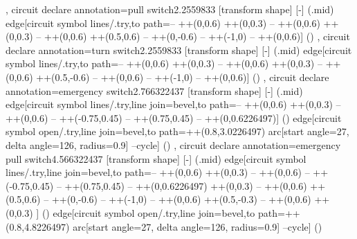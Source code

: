 {{  },
  circuit declare annotation={pull switch}{2.2559833\tikzcircuitssizeunit}
  {
    [transform shape]
    [-]
    (\tikzlastnode.mid) edge[circuit symbol lines/.try,to path={-- ++(0,0.6\tikzcircuitssizeunit) ++(0,0.3\tikzcircuitssizeunit) -- ++(0,0.6\tikzcircuitssizeunit)  ++(0,0.3\tikzcircuitssizeunit) -- ++(0,0.6\tikzcircuitssizeunit) ++(0.5\tikzcircuitssizeunit,0.6\tikzcircuitssizeunit) -- ++(0,-0.6\tikzcircuitssizeunit) -- ++(-1\tikzcircuitssizeunit,0) -- ++(0,0.6\tikzcircuitssizeunit)}] ()
  },
  circuit declare annotation={turn switch}{2.2559833\tikzcircuitssizeunit}
  {
    [transform shape]
    [-]
    (\tikzlastnode.mid) edge[circuit symbol lines/.try,to path={-- ++(0,0.6\tikzcircuitssizeunit) ++(0,0.3\tikzcircuitssizeunit) -- ++(0,0.6\tikzcircuitssizeunit)  ++(0,0.3\tikzcircuitssizeunit) -- ++(0,0.6\tikzcircuitssizeunit) ++(0.5\tikzcircuitssizeunit,-0.6\tikzcircuitssizeunit) -- ++(0,0.6\tikzcircuitssizeunit) -- ++(-1\tikzcircuitssizeunit,0) -- ++(0,0.6\tikzcircuitssizeunit)}] ()
  },
  circuit declare annotation={emergency switch}{2.766322437\tikzcircuitssizeunit}
  {
    [transform shape]
    [-]
    (\tikzlastnode.mid) edge[circuit symbol lines/.try,line join=bevel,to path={-- ++(0,0.6\tikzcircuitssizeunit) ++(0,0.3\tikzcircuitssizeunit) -- ++(0,0.6\tikzcircuitssizeunit) -- ++(-0.75\tikzcircuitssizeunit,0.45\tikzcircuitssizeunit)  -- ++(0.75\tikzcircuitssizeunit,0.45\tikzcircuitssizeunit) -- ++(0,0.6226497\tikzcircuitssizeunit)}] () edge[circuit symbol open/.try,line join=bevel,to path={++(0.8\tikzcircuitssizeunit,3.0226497\tikzcircuitssizeunit) arc[start angle=27, delta angle=126, radius=0.9\tikzcircuitssizeunit] --cycle}] ()
  },
  circuit declare annotation={emergency pull switch}{4.566322437\tikzcircuitssizeunit}
  {
    [transform shape]
    [-]
    (\tikzlastnode.mid) edge[circuit symbol lines/.try,line join=bevel,to path={-- ++(0,0.6\tikzcircuitssizeunit) ++(0,0.3\tikzcircuitssizeunit) -- ++(0,0.6\tikzcircuitssizeunit) -- ++(-0.75\tikzcircuitssizeunit,0.45\tikzcircuitssizeunit)  -- ++(0.75\tikzcircuitssizeunit,0.45\tikzcircuitssizeunit) -- ++(0,0.6226497\tikzcircuitssizeunit) ++(0,0.3\tikzcircuitssizeunit) -- ++(0,0.6\tikzcircuitssizeunit) ++(0.5\tikzcircuitssizeunit,0.6\tikzcircuitssizeunit) -- ++(0,-0.6\tikzcircuitssizeunit) -- ++(-1\tikzcircuitssizeunit,0) -- ++(0,0.6\tikzcircuitssizeunit) ++(0.5\tikzcircuitssizeunit,-0.3\tikzcircuitssizeunit) -- ++(0,0.6\tikzcircuitssizeunit) ++(0,0.3\tikzcircuitssizeunit) } ] () edge[circuit symbol open/.try,line join=bevel,to path={++(0.8\tikzcircuitssizeunit,4.8226497\tikzcircuitssizeunit) arc[start angle=27, delta angle=126, radius=0.9\tikzcircuitssizeunit] --cycle}] ()
}}
